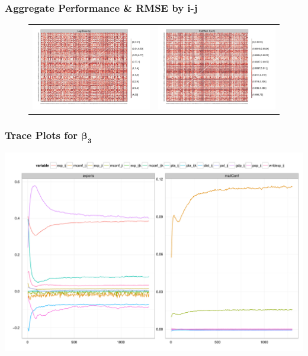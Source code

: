\documentclass[10pt, compress]{beamer}
\begin{document}
\frame
{
\frametitle{Aggregate Performance \& RMSE by i-j}
  
  \begin{figure}[ht]
  \centering
    \begin{tabular}{cc}
    \hspace*{-.63in}
      \includegraphics[width=.6\textwidth]{expiperf.pdf} & 
      \includegraphics[width=.6\textwidth]{mconfiperf.pdf}
    \end{tabular}
  \end{figure}
}

\frame
{
\frametitle{Trace Plots for $\boldsymbol{\beta_{3}}$}
  \centering
  \includegraphics[width=1\textwidth]{trace.pdf}
}
\end{document}
